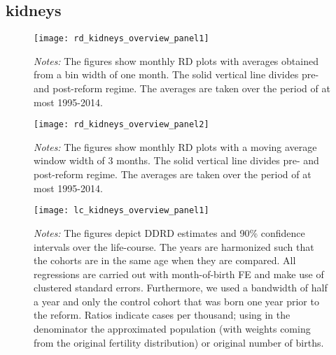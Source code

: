 \subsection{kidneys}
\begin{landscape}
\begin{figure}[H]
	\centering
	\begin{minipage}{.95\linewidth}
	\texttt{[image: rd\_kidneys\_overview\_panel1]}
	{\scriptsize \emph{Notes:} The figures show monthly RD plots with averages obtained from a bin width of one month. The solid vertical line divides pre- and post-reform regime. The averages are taken over the period of at most 1995-2014. \par}
\end{minipage}
\end{figure}
\end{landscape}
\begin{landscape}
\begin{figure}[H]
	\centering
\begin{minipage}{.95\linewidth}
	\texttt{[image: rd\_kidneys\_overview\_panel2]}
	{\scriptsize \emph{Notes:} The figures show monthly RD plots with a moving average window width of 3 months. The solid vertical line divides pre- and post-reform regime. The averages are taken over the period of at most 1995-2014. \par}
\end{minipage}
\end{figure}
\end{landscape}


\begin{landscape}
\begin{figure}[H]
\centering
\begin{minipage}{.9\linewidth}
\texttt{[image: lc\_kidneys\_overview\_panel1]}
{\scriptsize \emph{Notes:} The figures depict DDRD estimates and 90\% confidence intervals over the life-course. The years are harmonized such that the cohorts are in the same age when they are compared. All regressions are carried out with month-of-birth FE and make use of clustered standard errors. Furthermore, we used a bandwidth of half a year and only the control cohort that was born one year prior to the reform. Ratios indicate cases per thousand; using in the denominator the approximated population (with weights coming from the original fertility distribution) or original number of births. \par}
\end{minipage}
\end{figure}
\end{landscape}
